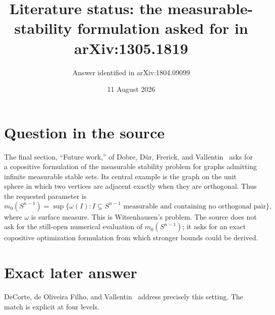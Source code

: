 \documentclass[11pt]{article}
\title{Literature status: the measurable-stability formulation asked for in arXiv:1305.1819}
\author{Answer identified in arXiv:1804.09099}
\date{11 August 2026}
\newcommand{\Sph}{S^{n-1}}
\begin{document}
\maketitle

\begin{center}
\end{center}

\section{Question in the source}

The final section, ``Future work,'' of Dobre, D\"ur, Frerick, and
Vallentin~\cite{source} asks for a copositive formulation of the measurable
stability problem for graphs admitting infinite measurable stable sets.  Its
central example is the graph on the unit sphere in which two vertices are
adjacent exactly when they are orthogonal.  Thus the requested parameter is
\[
 m_0(\Sph)=\sup\{\omega(I): I\subseteq\Sph\text{ measurable and containing
 no orthogonal pair}\},
\]
where $\omega$ is surface measure.  This is Witsenhausen's problem.  The source
does not ask for the still-open numerical evaluation of $m_0(\Sph)$; it asks
for an exact copositive optimization formulation from which stronger bounds
could be derived.

\section{Exact later answer}

DeCorte, de Oliveira Filho, and Vallentin~\cite{answer} address precisely this
setting.  The match is explicit at four levels.
\end{document}
